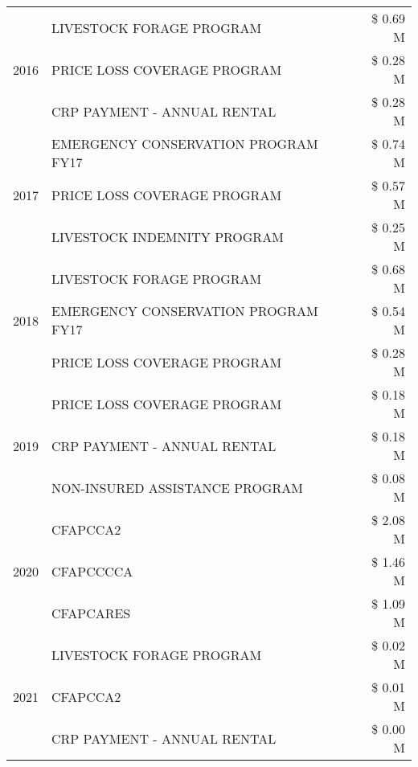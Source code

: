 \begin{tabular}{llr}
\cline{1-3}
\multirow[t]{3}{*}{2016} & LIVESTOCK FORAGE PROGRAM & \$ 0.69 M \\
 & PRICE LOSS COVERAGE PROGRAM & \$ 0.28 M \\
 & CRP PAYMENT - ANNUAL RENTAL & \$ 0.28 M \\
\cline{1-3}
\multirow[t]{3}{*}{2017} & EMERGENCY CONSERVATION PROGRAM FY17 & \$ 0.74 M \\
 & PRICE LOSS COVERAGE PROGRAM & \$ 0.57 M \\
 & LIVESTOCK INDEMNITY PROGRAM & \$ 0.25 M \\
\cline{1-3}
\multirow[t]{3}{*}{2018} & LIVESTOCK FORAGE PROGRAM & \$ 0.68 M \\
 & EMERGENCY CONSERVATION PROGRAM FY17 & \$ 0.54 M \\
 & PRICE LOSS COVERAGE PROGRAM & \$ 0.28 M \\
\cline{1-3}
\multirow[t]{3}{*}{2019} & PRICE LOSS COVERAGE PROGRAM & \$ 0.18 M \\
 & CRP PAYMENT - ANNUAL RENTAL & \$ 0.18 M \\
 & NON-INSURED ASSISTANCE PROGRAM & \$ 0.08 M \\
\cline{1-3}
\multirow[t]{3}{*}{2020} & CFAPCCA2 & \$ 2.08 M \\
 & CFAPCCCCA & \$ 1.46 M \\
 & CFAPCARES & \$ 1.09 M \\
\cline{1-3}
\multirow[t]{3}{*}{2021} & LIVESTOCK FORAGE PROGRAM & \$ 0.02 M \\
 & CFAPCCA2 & \$ 0.01 M \\
 & CRP PAYMENT - ANNUAL RENTAL & \$ 0.00 M \\
\cline{1-3}
\bottomrule
\end{tabular}

